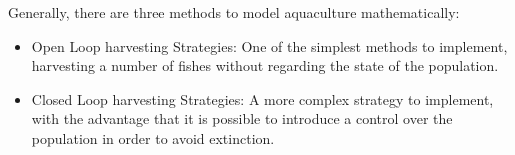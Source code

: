 Generally, there are three methods to model aquaculture mathematically:

\begin{itemize}
\item Open Loop harvesting Strategies: One of the simplest methods to implement, harvesting a number of fishes without regarding the state of the population.

\item Closed Loop harvesting Strategies: A more complex strategy to implement, with the advantage that it is possible to introduce a control over the population in order to avoid extinction.
\end{itemize}
